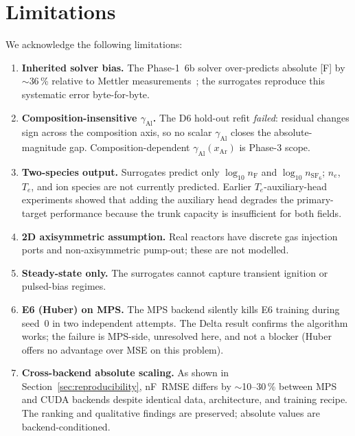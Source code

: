 \documentclass[11pt,a4paper]{article}
\begin{document}
\section{Limitations}
\label{sec:limitations}

We acknowledge the following limitations:

\begin{enumerate}[itemsep=2pt,topsep=2pt]
  \item \textbf{Inherited solver bias.}  The Phase-1~6b solver
        over-predicts absolute [F] by $\sim$36\,\% relative to
        Mettler measurements~\citep{mettler2020}; the surrogates
        reproduce this systematic error byte-for-byte.

  \item \textbf{Composition-insensitive $\gamma_\mathrm{Al}$.}  The
        D6 hold-out refit \emph{failed}: residual changes sign across
        the composition axis, so no scalar $\gamma_\mathrm{Al}$
        closes the absolute-magnitude gap.  Composition-dependent
        $\gamma_\mathrm{Al}(x_\mathrm{Ar})$ is Phase-3 scope.

  \item \textbf{Two-species output.}  Surrogates predict only
        $\log_{10} n_\mathrm{F}$ and $\log_{10} n_{\mathrm{SF}_6}$;
        $n_e$, $T_e$, and ion species are not currently predicted.
        Earlier $T_e$-auxiliary-head experiments showed that adding
        the auxiliary head degrades the primary-target performance
        because the trunk capacity is insufficient for both fields.

  \item \textbf{2D axisymmetric assumption.}  Real reactors have
        discrete gas injection ports and non-axisymmetric pump-out;
        these are not modelled.

  \item \textbf{Steady-state only.}  The surrogates cannot capture
        transient ignition or pulsed-bias regimes.

  \item \textbf{E6 (Huber) on MPS.}  The MPS backend silently kills
        E6 training during seed~0 in two independent attempts.  The
        Delta result confirms the algorithm works; the failure is
        MPS-side, unresolved here, and not a blocker (Huber offers
        no advantage over MSE on this problem).

  \item \textbf{Cross-backend absolute scaling.}  As shown in
        Section~\ref{sec:reproducibility}, nF~RMSE differs by
        $\sim$10--30\,\% between MPS and CUDA backends despite
        identical data, architecture, and training recipe.  The
        ranking and qualitative findings are preserved; absolute
        values are backend-conditioned.
\end{enumerate}
\end{document}
